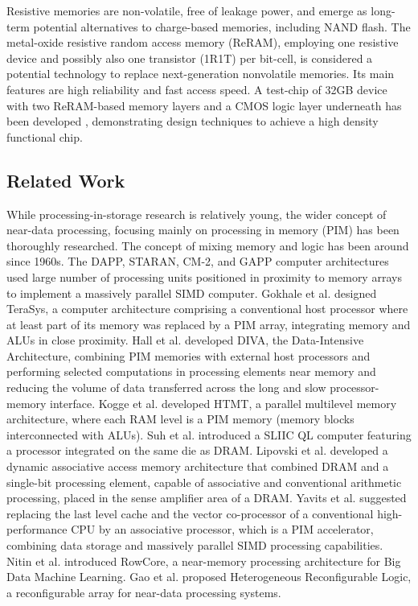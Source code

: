 \documentclass{superfri}
\begin{document}
	Resistive memories are non-volatile, free of leakage power, and emerge as long-term potential alternatives to charge-based memories, including NAND flash. The metal-oxide resistive random access memory (ReRAM), employing one resistive device and possibly also one transistor (1R1T) per bit-cell, is considered a potential technology to replace next-generation nonvolatile memories. Its main features are high reliability and fast access speed. A test-chip of 32GB device with two ReRAM-based memory layers and a CMOS logic layer underneath has been developed \cite{liu2014130}, demonstrating design techniques to achieve a high density functional chip. 
	
	\subsection{Related Work}
	\label{sec:related_work}
	
	
	While processing-in-storage research is relatively young, the wider concept of near-data processing, focusing mainly on processing in memory (PIM) has been thoroughly researched. The concept of mixing memory and logic has been around since 1960s. The DAPP, STARAN, CM-2, and GAPP computer architectures \cite{potter1989array} used large number of processing units positioned in proximity to memory arrays to implement a massively parallel SIMD computer. Gokhale et al. \cite{gokhale1995processing} designed TeraSys, a computer architecture comprising a conventional host processor where at least part of its memory was replaced by a PIM array, integrating memory and ALUs in close proximity. Hall et al. \cite{hall1999mapping} developed DIVA, the Data-Intensive Architecture, combining PIM memories with external host processors and performing selected computations in processing elements near memory and reducing the volume of data transferred across the long and slow processor-memory interface. Kogge et al. \cite{kogge2000pim} developed HTMT, a parallel multilevel memory architecture, where each RAM level is a PIM memory (memory blocks interconnected with ALUs). Suh et al. \cite{suh2001pim}  introduced a SLIIC QL computer featuring a processor integrated on the same die as DRAM. Lipovski et al. \cite{lipovski1999dynamic} developed a dynamic associative access memory architecture that combined DRAM and a single-bit processing element, capable of associative and conventional arithmetic processing, placed in the sense amplifier area of a DRAM. Yavits et al. \cite{yavits2015computer} suggested replacing the last level cache and the vector co-processor of a conventional high-performance CPU by an associative processor, which is a PIM accelerator, combining data storage and massively parallel SIMD processing capabilities. Nitin et al. \cite{thottethodi2016rowcore} introduced RowCore, a near-memory processing architecture for Big Data Machine Learning. Gao et al. \cite{gao2016hrl} proposed Heterogeneous Reconfigurable Logic, a reconfigurable array for near-data processing systems.
	
\end{document}
